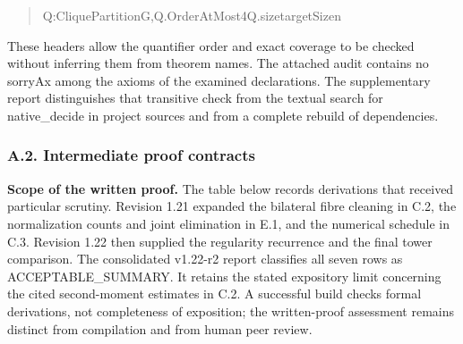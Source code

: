 \documentclass[english,11pt,a4paper]{article}
\newlength{\LeanCharWidth}
\begin{document}
\begin{quote}
\noindent \hspace*{\dimexpr 8\LeanCharWidth\relax}{\LeanSymbols ∃}\hspace*{\dimexpr 1\LeanCharWidth\relax}Q\hspace*{\dimexpr 1\LeanCharWidth\relax}:\hspace*{\dimexpr 1\LeanCharWidth\relax}CliquePartition\hspace*{\dimexpr 1\LeanCharWidth\relax}G,\hspace*{\dimexpr 1\LeanCharWidth\relax}Q.OrderAtMost\hspace*{\dimexpr 1\LeanCharWidth\relax}4\hspace*{\dimexpr 1\LeanCharWidth\relax}{\LeanSymbols ∧}\hspace*{\dimexpr 1\LeanCharWidth\relax}Q.size\hspace*{\dimexpr 1\LeanCharWidth\relax}{\LeanSymbols ≤}\hspace*{\dimexpr 1\LeanCharWidth\relax}targetSize\hspace*{\dimexpr 1\LeanCharWidth\relax}n\par
\end{quote}

These headers allow the quantifier order and exact coverage to be checked without inferring them from theorem names. The attached audit contains no {\ttfamily\small sorryAx} among the axioms of the examined declarations. The supplementary report distinguishes that transitive check from the textual search for {\ttfamily\small native\_\discretionary{\hbox{\ensuremath{\hookrightarrow}}}{}{}decide} in project sources and from a complete rebuild of dependencies.

\subsubsection{A.2. Intermediate proof contracts}\label{a.2.-intermediate-proof-contracts}

\textbf{Scope of the written proof.} The table below records derivations that received particular scrutiny. Revision 1.21 expanded the bilateral fibre cleaning in C.2, the normalization counts and joint elimination in E.1, and the numerical schedule in C.3. Revision 1.22 then supplied the regularity recurrence and the final tower comparison. The consolidated v1.22-r2 report classifies all seven rows as {\ttfamily\small ACCEPTABLE\_\discretionary{\hbox{\ensuremath{\hookrightarrow}}}{}{}SUMMARY}. It retains the stated expository limit concerning the cited second-moment estimates in C.2. A successful build checks formal derivations, not completeness of exposition; the written-proof assessment remains distinct from compilation and from human peer review.
\end{document}

